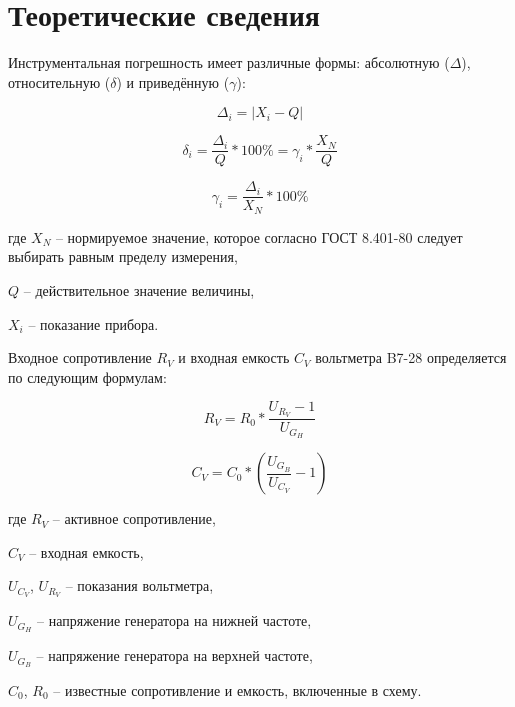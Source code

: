 \section{Теоретические сведения}

Инструментальная погрешность имеет различные формы: абсолютную ($ \Delta $), относительную ($ \delta $) и приведённую ($ \gamma $):

\begin{equation*}
  \label{eq:equation1}
  \Delta_{i} = \vert X_{i} - Q \vert
\end{equation*}

\begin{equation*}
  \label{eq:equation2}
  \delta_{i} = \dfrac{\Delta_{i}}{Q} * 100\% = \gamma_{i} * \dfrac{X_{N}}{Q}
\end{equation*}

\begin{equation*}
  \label{eq:equation3}
  \gamma_{i} = \dfrac{\Delta_{i}}{X_{N}}*100\%
\end{equation*}

\noindent где $ X_{N} $ -- нормируемое значение, которое согласно ГОСТ 8.401-80 следует выбирать равным пределу измерения,

$ Q $ -- действительное значение величины,

$ X_{i} $ -- показание прибора.

\vspace{4mm}

Входное сопротивление $ R_{V} $ и входная емкость $ C_{V} $ вольтметра B7-28 определяется по следующим формулам:

\begin{equation*}
  \label{eq:equation4}
  R_{V} = R_{0} * \dfrac{U_{R_{V}} - 1}{U_{G_{H}}}
\end{equation*}

\begin{equation*}
  \label{eq:equation5}
  C_{V} = C_{0} * ( \dfrac{U_{G_{B}}}{U_{C_{V}}} - 1)
\end{equation*}

\noindent где $ R_{V} $ -- активное сопротивление,\par
$ C_{V} $ -- входная емкость,\par
$ U_{C_{V}} $, $ U_{R_{V}} $ -- показания вольтметра,\par
$ U_{G_{H}} $ -- напряжение генератора на нижней частоте,\par
$ U_{G_{B}} $ -- напряжение генератора на верхней частоте,\par
$ C_{0} $, $ R_{0} $ -- известные сопротивление и емкость, включенные в схему.\par

